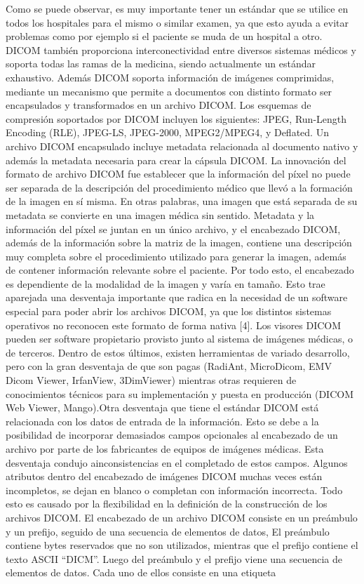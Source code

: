 \documentclass{article}
\begin{document}
		Como se puede observar, es muy importante tener un estándar que se utilice en todos los hospitales para el mismo o similar examen, ya que esto ayuda a evitar problemas como por ejemplo si el paciente se muda de un hospital a otro. DICOM también proporciona interconectividad entre diversos sistemas médicos y soporta
todas las ramas de la medicina, siendo actualmente un estándar exhaustivo. Además DICOM soporta información de imágenes comprimidas, mediante un mecanismo que permite a documentos con distinto formato ser encapsulados y transformados en un archivo DICOM. Los esquemas de compresión soportados por DICOM incluyen los siguientes: JPEG, Run-Length Encoding (RLE), JPEG-LS, JPEG-2000, MPEG2/MPEG4, y Deflated. Un archivo DICOM encapsulado incluye metadata relacionada al documento nativo y además la metadata necesaria para crear la cápsula DICOM.
		La innovación del formato de archivo DICOM fue establecer que la información del píxel no puede ser separada de la descripción del procedimiento
médico que llevó a la formación de la imagen en sí misma. En otras palabras, una imagen que está separada de su metadata se convierte en una imagen médica sin sentido. Metadata y la información del píxel se juntan en un único archivo, y el encabezado DICOM, además de la información sobre la matriz de la imagen, contiene una descripción muy completa sobre el procedimiento utilizado para generar la imagen, además de contener información relevante sobre el paciente. Por todo esto, el encabezado es dependiente de la modalidad de la imagen y varía en tamaño. Esto trae aparejada una desventaja importante que radica en la necesidad de un software especial para poder abrir los archivos DICOM, ya que los distintos sistemas operativos no reconocen este formato de forma nativa [4]. Los visores
		DICOM pueden ser software propietario provisto junto al sistema de imágenes médicas, o de terceros. Dentro de estos últimos, existen herramientas de variado desarrollo, pero con la gran desventaja de que son pagas (RadiAnt, MicroDicom, EMV Dicom Viewer, IrfanView, 3DimViewer) mientras otras requieren de conocimientos técnicos para su implementación y puesta en producción (DICOM Web Viewer, Mango).Otra desventaja que tiene el estándar DICOM está relacionada con los datos de entrada de la información. Esto se debe a la posibilidad de incorporar demasiados campos opcionales al encabezado de un archivo por parte de los
fabricantes de equipos de imágenes médicas. Esta desventaja condujo ainconsistencias en el completado de estos campos. Algunos atributos dentro del encabezado de imágenes DICOM muchas veces están incompletos, se dejan en blanco o completan con información incorrecta. Todo esto es causado por la flexibilidad en la definición de la construcción de los archivos DICOM. El encabezado de un archivo DICOM consiste en un preámbulo y un prefijo, seguido de una secuencia de elementos de datos, El preámbulo contiene bytes reservados que no son utilizados, mientras que el prefijo contiene el texto ASCII “DICM”. Luego del preámbulo y el prefijo viene una secuencia de elementos de datos. Cada uno de ellos consiste en una etiqueta
\end{document}
